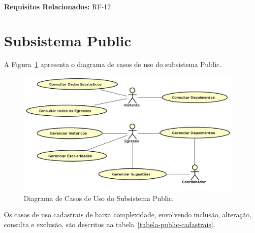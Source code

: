 \noindent  \textbf{Requisitos Relacionados:} RF-12   %












\newpage
\section{Subsistema Public}

A Figura~\ref{figura-caso-de-uso-public}  apresenta o diagrama de casos de uso do subsistema Public.

\begin{figure}[h!]
  \centering
  \includegraphics[width=1\textwidth]{figuras/casodeuso-public.jpg}
  \caption{Diagrama de Casos de Uso do Subsistema Public.}
  \label{figura-caso-de-uso-public}
\end{figure} 


Os casos de uso cadastrais de baixa complexidade, envolvendo inclusão, alteração, consulta e exclusão, são descritos na tabela~\ref{tabela-public-cadastrais}.

